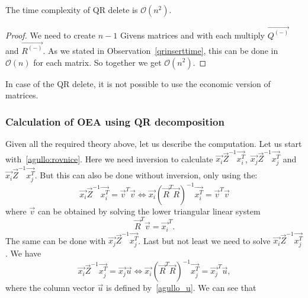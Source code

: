 \begin{observation} \label{qrdeletetime}
The time complexity of QR delete is   $\mathcal{O}(n^2)$.
\end{observation}

\begin{proof}
We need to create $n-1$ Givens matrices and with each multiply $\vec{Q^{(-)}}$ and $\vec{R^{(-)}}$. As we stated in Observation~\ref{qrinserttime}, this can be done in $\mathcal{O}(n)$ for each matrix.
So together we get $\mathcal{O}(n^2)$.
\end{proof}

\begin{note}
In case of the QR delete, it is not possible to use the economic version of matrices.
\end{note}







\subsubsection*{Calculation of OEA using QR decomposition}
Given all the required theory above, let us describe the computation. Let us start with~\eqref{agullo:rovnice}. Here we need inversion to calculate 
$\vec{x_i}\vec{Z}^{-1}\vec{x_i^T}$, $\vec{x_j}\vec{Z}^{-1}\vec{x_j^T}$ and $\vec{x_i}\vec{Z}^{-1}\vec{x_j^T}$. But this can also be done without inversion, only using the:
\begin{equation} \label{solveimi}
    \vec{x_i}\vec{Z}^{-1}\vec{x_i^T} = \vec{v}^T\vec{v}     \iff \vec{x_i}(\vec{R}^T\vec{R})^{-1}\vec{x_i^T} = \vec{v}^T\vec{v}
\end{equation} 
where $\vec{v}$ can be obtained by solving the lower triangular linear system
\begin{equation} \label{vsolution}
    \vec{R}^T\vec{v} = \vec{x_i}^T.
\end{equation} 
The same can be done with  $\vec{x_j}\vec{Z}^{-1}\vec{x_j^T}$. Last but not least we need to solve 
$\vec{x_i}\vec{Z}^{-1}\vec{x_j^T}$. We have
\begin{equation}
    \vec{x_i}\vec{Z}^{-1}\vec{x_j^T} = \vec{x_j}\vec{u}     \iff \vec{x_i}(\vec{R}^T\vec{R})^{-1}\vec{x_j^T} = \vec{x_j}^T\vec{u},
\end{equation} 
where the column vector $\vec{u}$ is defined by~\eqref{agullo_u}. We can see that 

